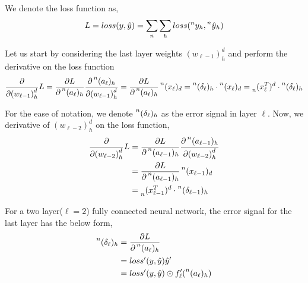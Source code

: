 \documentclass[12pt,a4paper]{article}%
\theoremstyle{definition}
\theoremstyle{plain}
\numberwithin{equation}{section}
\newcounter{subsubsubsection}[subsubsection]
\begin{document}
We denote the loss function as,
\begin{equation}
L = loss(y, \hat{y}) = \sum\limits_{n} \sum\limits_{h} loss(\prescript{n}{}{y_{h}}, \prescript{n}{}{\hat{y}}_{h})
\end{equation}

Let us start by considering the last layer weights ${(w_{\ell-1})}^{d}_{h} $ and perform the derivative on the loss function
\begin{equation}
\frac{\partial}{\partial {(w_{\ell-1})}^{d}_{h}} L = \frac{\partial L}{\partial \prescript{n}{}{(a_{\ell})}_{h}} \frac{\partial \prescript{n}{}{(a_{\ell})}_{h}}{\partial {(w_{\ell-1})}^{d}_{h}} = \frac{\partial L}{\partial \prescript{n}{}{(a_{\ell})}_{h}}  \prescript{n}{}{(x_{\ell})}_{d} =  \prescript{n}{}{(\delta_{\ell})}_{h} \cdot \prescript{n}{}{(x_{\ell})}_{d} = \prescript{}{n}{(x_{\ell}^{T})}^{d} \cdot \prescript{n}{}{(\delta_{\ell})}_{h} 
\end{equation}

For the ease of notation,  we denote  $\prescript{n}{}{(\delta_{\ell})}_{h}$ as the error signal in layer $\ell$. Now, we derivative of ${(w_{\ell-2})}^{d}_{h}$ on the loss function, 
\begin{align}
\frac{\partial}{\partial {(w_{\ell-2})}^{d}_{h}} L  &=  \frac{\partial L}{\partial \prescript{n}{}{(a_{\ell-1})}_{h}} \frac{\partial \prescript{n}{}{(a_{\ell-1})}_{h}}{\partial {(w_{\ell-2})}^{d}_{h}} \\
& = \frac{\partial L}{\partial \prescript{n}{}{(a_{\ell-1})}_{h}}  \prescript{n}{}{(x_{\ell-1})}_{d} \\
& = \prescript{}{n}{(x_{\ell-1}^{T})}^{d} \cdot \prescript{n}{}{(\delta_{\ell-1})}_{h} 
\end{align}


For a two layer($\ell = 2$) fully connected neural network,  the error signal for the last layer has the below form,
\begin{align}
\begin{split}
\prescript{n}{}{(\delta_{\ell})}_{h} &= \frac{\partial L}{\partial \prescript{n}{}{(a_{\ell})}_{h}} \\
															  &= loss'(y,\hat{y}) \hat{y}' \\
															  &= loss'(y,\hat{y}) \odot f'_{\ell}(\prescript{n}{}{(a_{\ell})}_{h})
\end{split}
\end{align}
\end{document}
